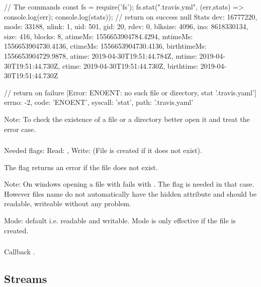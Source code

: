 \begin{js}
  // The commands
  const fs = require('fs');
  fs.stat(".travis.yml", (err,stats) => {console.log(err);
                                         console.log(stats)});
  // return on success
  null
  Stats {
    dev: 16777220,
    mode: 33188,
    nlink: 1,
    uid: 501,
    gid: 20,
    rdev: 0,
    blksize: 4096,
    ino: 8618330134,
    size: 416,
    blocks: 8,
    atimeMs: 1556653904784.4294,
    mtimeMs: 1556653904730.4136,
    ctimeMs: 1556653904730.4136,
    birthtimeMs: 1556653904729.9878,
    atime: 2019-04-30T19:51:44.784Z,
    mtime: 2019-04-30T19:51:44.730Z,
    ctime: 2019-04-30T19:51:44.730Z,
    birthtime: 2019-04-30T19:51:44.730Z }

  // return on failure
  { [Error: ENOENT: no such file or directory, stat '.travis.yaml']
    errno: -2,
    code: 'ENOENT',
    syscall: 'stat',
    path: '.travis.yaml' }
\end{js}

Note: To check the existence of a file or a directory better open it and treat
the error case.

\subsubsection{}

Needed flags: Read: , Write:  (File is created if it does
not exist).

The flag  returns an error if the file does not exist.

Note: On windows opening a file with  fails with . The
 flag is needed in that case. However files name  do
not automatically have the hidden attribute and should be readable, writeable
without any problem.

Mode: default  i.e. readable and writable. Mode is only effective
if the file is created.

\subsubsection{}

Callback .






\subsection{Streams}

